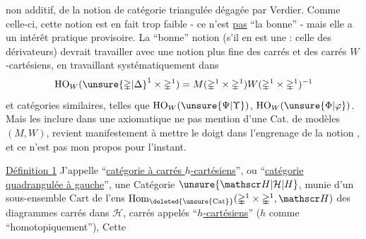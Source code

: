 non additif, de la notion de catégorie triangulée dégagée par Verdier. Comme celle-ci, cette notion est en fait trop faible - ce n'est \uline{pas} ``la bonne'' - mais elle a un intérêt pratique provisoire. La ``bonne'' notion (s'il en est une :  celle des dérivateurs) devrait travailler avec une notion plus fine des carrés et des carrés $W$-cartésiens, en travaillant systématiquement dans
\[
\mathrm{HO}_W(\unsure{\mathbb{\Delta}|\Delta}^1\times\mathbb{\Delta}^1)=M(\mathbb{\Delta}^1\times\mathbb{\Delta}^1)W(\mathbb{\Delta}^1\times\mathbb{\Delta}^1)^{-1}
\]
 et catégories similaires, telles que $\mathrm{HO}_W(\unsure{\Psi|\Upsilon})$, $\mathrm{HO}_W(\unsure{\Phi|\varphi})$. Mais les inclure dans une axiomatique ne  pas mention d'une Cat. de modèles $(M,W)$, revient manifestement à mettre le doigt dans l'engrenage de la notion  , et ce n'est pas mon propos pour l'instant.

\uline{Définition 1} J'appelle ``\uline{catégorie à carrés $h$-cartésiens}'', ou ``\uline{catégorie quadrangulée à gauche}'', une Catégorie $\unsure{\mathscr H|\mathcal H|H}$, munie d'un sous-ensemble $\mathrm{Cart}$ de l'ens $\mathrm{Hom}_{\deleted{\unsure{\mathrm{Cat}}}}(\mathbb{\Delta}^1\times\mathbb{\Delta}^1,\mathscr H)$ des diagrammes carrés
dans $\mathscr H$, carrés appelés ``\uline{$h$-cartésiens}'' ($h$ comme ``homotopiquement''), Cette
